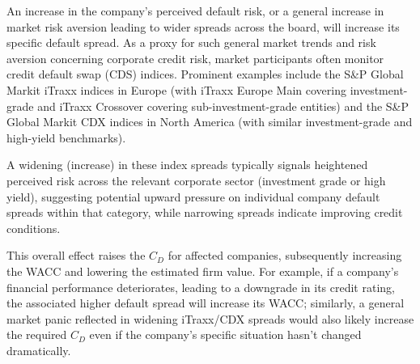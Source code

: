 An increase in the company's perceived default risk, or a general increase in market risk aversion leading to wider spreads across the board, will increase its specific default spread. As a proxy for such general market trends and risk aversion concerning corporate credit risk, market participants often monitor credit default swap (CDS) indices. Prominent examples include the S\&P Global Markit iTraxx indices in Europe (with iTraxx Europe Main covering investment-grade and iTraxx Crossover covering sub-investment-grade entities) and the S\&P Global Markit CDX indices in North America (with similar investment-grade and high-yield benchmarks). 

A widening (increase) in these index spreads typically signals heightened perceived risk across the relevant corporate sector (investment grade or high yield), suggesting potential upward pressure on individual company default spreads within that category, while narrowing spreads indicate improving credit conditions. 

This overall effect raises the \(C_D\) for affected companies, subsequently increasing the WACC and lowering the estimated firm value. For example, if a company's financial performance deteriorates, leading to a downgrade in its credit rating, the associated higher default spread will increase its WACC; similarly, a general market panic reflected in widening iTraxx/CDX spreads would also likely increase the required \(C_D\) even if the company's specific situation hasn't changed dramatically.

